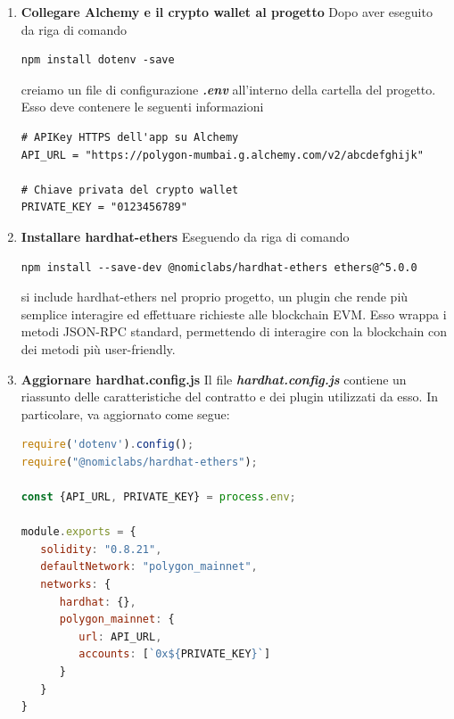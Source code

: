 \documentclass[12pt]{report}
\begin{document}
\begin{enumerate}[topsep=5pt, itemsep=0pt]
\item \textbf{Collegare Alchemy e il crypto wallet al progetto}\newline
Dopo aver eseguito da riga di comando
\begin{lstlisting}[language=HTML, numbers=none, aboveskip=2pt, belowskip=-3pt]
npm install dotenv -save
\end{lstlisting}
creiamo un file di configurazione \textit{\textbf{.env}} all'interno della cartella del progetto.\newline
Esso deve contenere le seguenti informazioni
\begin{lstlisting}[language=HTML, numbers=none, aboveskip=2pt]
# APIKey HTTPS dell'app su Alchemy
API_URL = "https://polygon-mumbai.g.alchemy.com/v2/abcdefghijk"

# Chiave privata del crypto wallet
PRIVATE_KEY = "0123456789"
\end{lstlisting}\newpage

\item \textbf{Installare hardhat-ethers}\newline
Eseguendo da riga di comando
\begin{lstlisting}[language=HTML, numbers=none, aboveskip=2pt, belowskip=-3pt]
npm install --save-dev @nomiclabs/hardhat-ethers ethers@^5.0.0
\end{lstlisting}
si include hardhat-ethers nel proprio progetto, un plugin che rende più semplice interagire ed effettuare richieste alle blockchain EVM. Esso wrappa i metodi JSON-RPC standard, permettendo di interagire con la blockchain con dei metodi più user-friendly.

\item \textbf{Aggiornare hardhat.config.js}\newline
Il file \textit{\textbf{hardhat.config.js}} contiene un riassunto delle caratteristiche del contratto e dei plugin utilizzati da esso.\newline
In particolare, va aggiornato come segue:
\begin{lstlisting}[language=JavaScript, aboveskip=2pt]
require('dotenv').config();
require("@nomiclabs/hardhat-ethers");

const {API_URL, PRIVATE_KEY} = process.env;

module.exports = {
   solidity: "0.8.21",
   defaultNetwork: "polygon_mainnet",
   networks: {
      hardhat: {},
      polygon_mainnet: {
         url: API_URL,
         accounts: [`0x${PRIVATE_KEY}`]
      }
   }
}
\end{lstlisting}\newpage


\end{enumerate}
\end{document}

